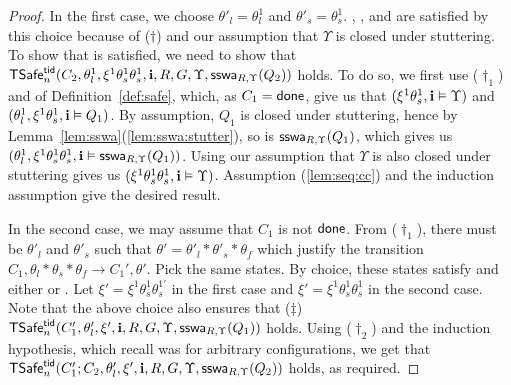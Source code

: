 \begin{proof}
In the first case, we choose 
$\theta'_l=\theta^1_l$   
and  $\theta'_s = \theta^1_s$.
, , and  are satisfied by this choice because of  ($\dag$)
and our assumption that $\Upsilon$ is closed under stuttering.
To show that  is satisfied, we need to show that 
$\safe_n(C_2,\theta^1_l,\xi^1\theta^1_s\theta^1_s,\intp,R,G,\Upsilon, \sswa{Q_2}{R}{\Upsilon})$ holds.
To do so, we first use ($\dag_1$) and  of Definition~\ref{def:safe}, which, as $C_1=\done$,
give us that 
$(\xi^1\theta^1_s , \intp\vDash \Upsilon)$ and $(\theta^1_l,\xi^1\theta^1_s,\intp \vDash Q_1)$.
By assumption, $Q_1$ is closed under stuttering, hence by 
Lemma~\ref{lem:sswa}(\ref{lem:sswa:stutter}), 
so is  $\sswa{Q_1}{R}{\Upsilon}$, which gives us 
$(\theta^1_l,\xi^1\theta^1_s\theta^1_s,\intp \vDash \sswa{Q_1}{R}{\Upsilon})$.
Using our assumption  that $\Upsilon$ is also closed under stuttering 
gives us $(\xi^1\theta^1_s\theta^1_s,\intp \vDash \Upsilon)$.
Assumption (\ref{lem:seq:cc}) and the induction assumption  give  
the desired result.
%
%

In the second case, we may assume that $C_1$ is not $\done$.
From ($\dag_1$), 
there must be 
$\theta'_l$ and $\theta'_s$  such that $\theta'=\theta'_l * \theta'_s * \theta_f$
which justify the transition 
$C_1, \theta_l*\theta_s*\theta_f \rightarrow C_1',\theta'$.
Pick the same states.
By choice, these states satisfy  and either  
 or .
Let $\xi'=\xi^1\theta^1_s\theta^{1'}_s$  in the first case and $\xi'=\xi^1\theta^1_s\theta^1_s$ in the second case.
Note that the above choice also ensures that ($\ddag$)  
$\safe_n(C'_1, \theta'_l,\xi',\intp,R,G,\Upsilon, \sswa{Q_1}{R}{\Upsilon})$ holds.
Using ($\dagger_2$) and the induction hypothesis, which recall was for arbitrary configurations,
we get that 
$\safe_n(C'_1;C_2, \theta'_l,\xi',\intp,R,G,\Upsilon, \sswa{Q_2}{R}{\Upsilon})$ holds, as required.


\end{proof}
